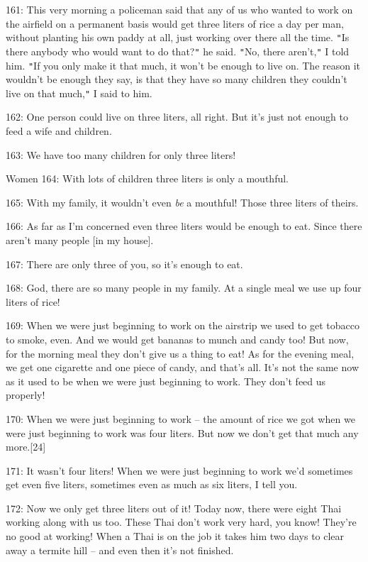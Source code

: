 {161: This very morning a policeman said that any of us who wanted to work
on the airfield on a permanent basis would get three liters of rice a day per man,
without planting his own paddy at all, just working over there all the time. \texttt{"}Is
there anybody who would want to do that?\texttt{"} he said. \texttt{"}No, there
aren't,\texttt{"} I told him. \texttt{"}If you only make it that much, it won't
be enough to live on. The reason it wouldn't be enough they say, is that they have
so many children they couldn't live on that much,\texttt{"} I said to him. }

{162: One person could live on three liters, all right. But it's just not
enough to feed a wife and children.}

{163: We have too many children for only three liters! }

{Women 164: With lots of children three liters is only a mouthful. }

{165: With my family, it wouldn't even }{\textit{be}}{ a mouthful!
Those three liters of theirs.}

{166: As far as I'm concerned even three liters would be enough to eat.
Since there aren't many people [in my house]. }

{167: There are only three of you, so it's enough to eat. }

{168: God, there are so many people in my family. At a single meal we use
up four liters of rice!}

{169: When we were just beginning to work on the airstrip we used to get
tobacco to smoke, even. And we would get bananas to munch and candy too! But now,
for the morning meal they don't give us a thing to eat! As for the evening meal,
we get one cigarette and one piece of candy, and that's all. It's not the same
now as it used to be when we were just beginning to work. They don't feed us properly!}

{170: When we were just beginning to work -- the amount of rice we got when
we were just beginning to work was four liters. But now we don't get that much
any more.[24]}

{171: It wasn't four liters! When we were just beginning to work we'd sometimes
get even five liters, sometimes even as much as six liters, I tell you.}

{172: Now we only get three liters out of it! Today now, there were eight
Thai working along with us too. These Thai don't work very hard, you know! They're
no good at working! When a Thai is on the job it takes him two days to clear away
a termite hill -- and even then it's not finished. }

